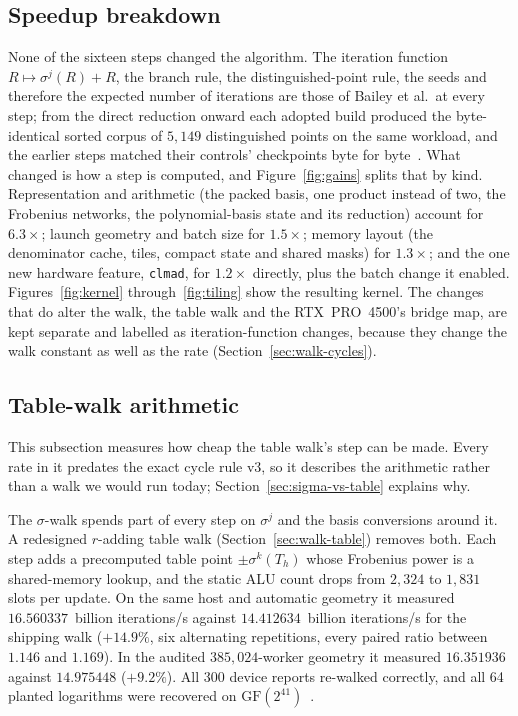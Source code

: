 \subsection{Speedup breakdown}
\label{sec:what-changed}

None of the sixteen steps changed the algorithm. The iteration function
$R\mapsto\sigma^j(R)+R$, the branch rule, the distinguished-point rule,
the seeds and therefore the expected number of iterations are those of
Bailey et al.\ at every step; from the direct reduction onward each
adopted build produced the byte-identical sorted corpus of $5{,}149$
distinguished points on the same workload, and the earlier steps matched
their controls' checkpoints byte for byte~.
What changed is how a step is computed, and Figure~\ref{fig:gains} splits
that by kind. Representation and arithmetic (the packed basis, one
product instead of two, the Frobenius networks, the polynomial-basis
state and its reduction) account for $6.3\times$; launch geometry and
batch size for $1.5\times$; memory layout (the denominator cache, tiles,
compact state and shared masks) for $1.3\times$; and the one new hardware
feature, \texttt{clmad}, for $1.2\times$ directly, plus the batch change it
enabled. Figures~\ref{fig:kernel} through~\ref{fig:tiling} show the
resulting kernel. The changes that do alter the walk, the table walk and
the RTX~PRO~4500's bridge map, are kept separate and labelled as
iteration-function changes, because they change the walk constant as
well as the rate (Section~\ref{sec:walk-cycles}).



\subsection{Table-walk arithmetic}
\label{sec:tablewalk}

This subsection measures how cheap the table walk's step can be made.
Every rate in it predates the exact cycle rule v3, so it describes the
arithmetic rather than a walk we would run today;
Section~\ref{sec:sigma-vs-table} explains why.

The $\sigma$-walk spends part of every step on $\sigma^j$ and the
basis conversions around it. A redesigned $r$-adding table walk
(Section~\ref{sec:walk-table}) removes both. Each step adds a
precomputed table point $\pm\sigma^k(T_h)$ whose Frobenius power is a
shared-memory lookup, and the static ALU count drops from $2{,}324$ to
$1{,}831$ slots per update. On the same host and automatic geometry it
measured $16.560337$~billion iterations/s against $14.412634$~billion iterations/s for the shipping walk
($+14.9\%$, six alternating repetitions, every paired ratio between
$1.146$ and $1.169$). In the audited $385{,}024$-worker geometry it
measured $16.351936$ against $14.975448$ ($+9.2\%$). All 300 device
reports re-walked correctly, and all 64 planted logarithms were
recovered on $\mathrm{GF}(2^{41})$~.

